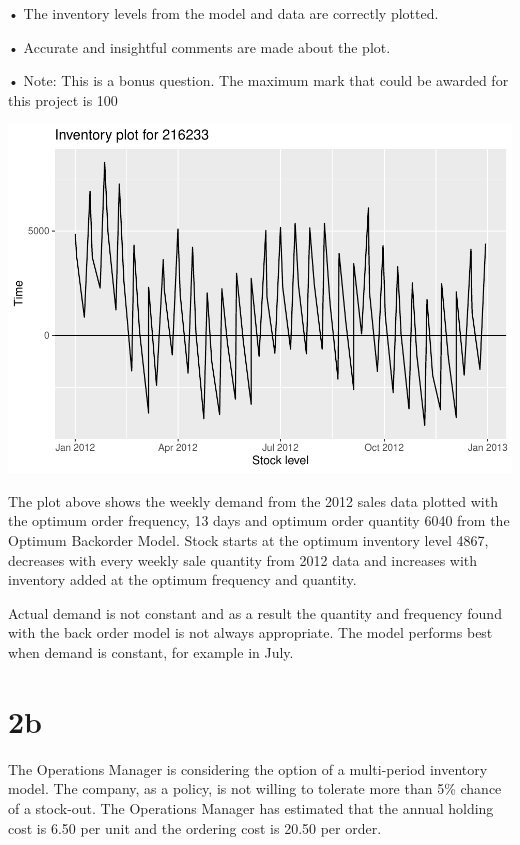 \documentclass[
  11pt,
]{article}
\begin{document}
• The inventory levels from the model and data are correctly plotted.

• Accurate and insightful comments are made about the plot.

• Note: This is a bonus question. The maximum mark that could be awarded
for this project is 100

\includegraphics{Assignment-STAT702_files/figure-latex/2aiii-1.pdf}

The plot above shows the weekly demand from the 2012 sales data plotted
with the optimum order frequency, 13 days and optimum order quantity
6040 from the Optimum Backorder Model. Stock starts at the optimum
inventory level 4867, decreases with every weekly sale quantity from
2012 data and increases with inventory added at the optimum frequency
and quantity.

Actual demand is not constant and as a result the quantity and frequency
found with the back order model is not always appropriate. The model
performs best when demand is constant, for example in July.

\hypertarget{b}{%
\section{2b}\label{b}}

The Operations Manager is considering the option of a multi-period
inventory model. The company, as a policy, is not willing to tolerate
more than 5\% chance of a stock-out. The Operations Manager has
estimated that the annual holding cost is 6.50 per unit and the ordering
cost is 20.50 per order.
\end{document}
